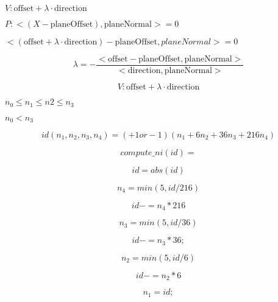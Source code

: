 \documentclass{article}
\begin{document}
$V: \mbox{offset} + \lambda \cdot \mbox{direction} $
\pagebreak

$ P: < (X - \mbox{planeOffset}), \mbox{planeNormal}> = 0 $
\pagebreak

$<(\mbox{offset} + \lambda \cdot \mbox{direction}) - \mbox{planeOffset},planeNormal> = 0$
\pagebreak

\[ \lambda = - \frac{<\mbox{offset}-\mbox{planeOffset},\mbox{planeNormal}>}{<\mbox{direction},\mbox{planeNormal}>} \]
\pagebreak

\[ V: \mbox{offset} + \lambda \cdot \mbox{direction} \]
\pagebreak

$n_0 \leq n_1 \leq n2 \leq n_3 $
\pagebreak

$ n_0 < n_3 $
\pagebreak

\[ id(n_1,n_2,n_3,n_4) = (+1 or -1)(n_1 + 6 n_2 + 36 n_3 + 216 n_4) \]
\pagebreak

\[ compute\_ni(id) = \]
\pagebreak

\[ id = abs(id) \]
\pagebreak

\[ n_4 = min(5,id/216) \]
\pagebreak

\[ id -= n_4*216 \]
\pagebreak

\[ n_3 = min(5,id/36) \]
\pagebreak

\[ id -= n_3*36; \]
\pagebreak

\[ n_2 = min(5,id/6) \]
\pagebreak

\[ id -= n_2*6 \]
\pagebreak

\[ n_1 = id; \]
\pagebreak
\end{document}
